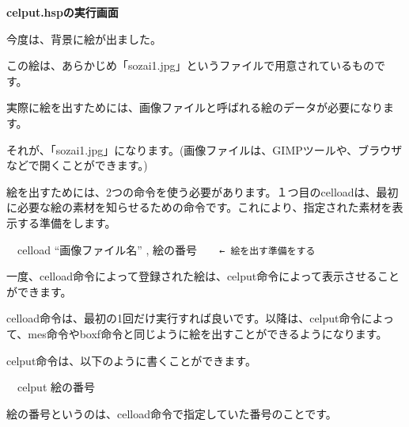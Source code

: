 \documentclass[a4paper,dvipdfmx]{jarticle}
\newcommand\textstyleqwerty[1]{#1}
\begin{document}
\bigskip


\bigskip


\bigskip


\bigskip


\bigskip


\bigskip


\bigskip


\bigskip


\bigskip


\bigskip


\bigskip


\bigskip


\bigskip


\bigskip

{\bfseries
celput.hspの実行画面}


\bigskip


\bigskip


\bigskip


\bigskip

今度は、背景に絵が出ました。

この絵は、あらかじめ「sozai1.jpg」というファイルで用意されているものです。

実際に絵を出すためには、画像ファイルと呼ばれる絵のデータが必要になります。

それが、「sozai1.jpg」になります。(画像ファイルは、GIMPツールや、ブラウザなどで開くことができます。)


\bigskip

絵を出すためには、2つの命令を使う必要があります。１つ目のcelloadは、最初に必要な絵の素材を知らせるための命令です。これにより、指定された素材を表示する準備をします。


\bigskip

\textstyleqwerty{\ \ celload “画像ファイル名” ,
絵の番号\ \ \ \ \texttt{← 絵を出す準備をする}}


\bigskip

一度、celload命令によって登録された絵は、celput命令によって表示させることができます。

celload命令は、最初の1回だけ実行すれば良いです。以降は、celput命令によって、mes命令やboxf命令と同じように絵を出すことができるようになります。


\bigskip

celput命令は、以下のように書くことができます。


\bigskip

\ \ celput 絵の番号


\bigskip

絵の番号というのは、celload命令で指定していた番号のことです。
\end{document}
